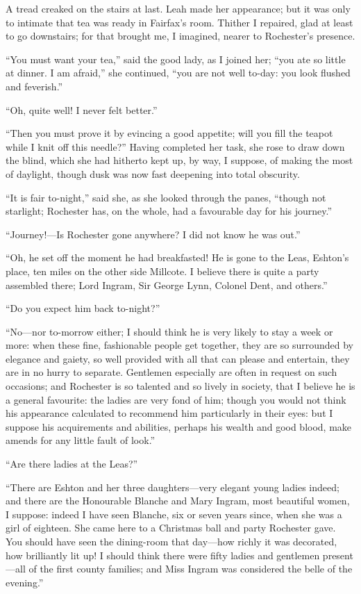 A tread creaked on the stairs at last.  Leah made her appearance; but it
was only to intimate that tea was ready in \Mrs{} Fairfax's room.  Thither
I repaired, glad at least to go downstairs; for that brought me, I
imagined, nearer to \Mr{} Rochester's presence.

\enquote{You must want your tea,} said the good lady, as I joined her;
\enquote{you ate so little at dinner.  I am afraid,} she continued,
\enquote{you are not well to-day: you look flushed and feverish.}

\enquote{Oh, quite well!  I never felt better.}

\enquote{Then you must prove it by evincing a good appetite; will you
fill the teapot while I knit off this needle?}  Having completed her
task, she rose to draw down the blind, which she had hitherto kept up,
by way, I suppose, of making the most of daylight, though dusk was now
fast deepening into total obscurity.

\enquote{It is fair to-night,} said she, as she looked through the
panes, \enquote{though not starlight; \Mr{} Rochester has, on the whole,
had a favourable day for his journey.}

\enquote{Journey!---Is \Mr{} Rochester gone anywhere?  I did not know he
was out.}

\enquote{Oh, he set off the moment he had breakfasted!  He is gone to
the Leas, \Mr{} Eshton's place, ten miles on the other side Millcote.  I
believe there is quite a party assembled there; Lord Ingram, Sir George
Lynn, Colonel Dent, and others.}

\enquote{Do you expect him back to-night?}

\enquote{No---nor to-morrow either; I should think he is very likely to
stay a week or more: when these fine, fashionable people get together,
they are so surrounded by elegance and gaiety, so well provided with all
that can please and entertain, they are in no hurry to separate. 
Gentlemen especially are often in request on such occasions; and \Mr{}
 Rochester is so talented and so lively in society, that I believe he is
a general favourite: the ladies are very fond of him; though you would
not think his appearance calculated to recommend him particularly in
their eyes: but I suppose his acquirements and abilities, perhaps his
wealth and good blood, make amends for any little fault of look.}

\enquote{Are there ladies at the Leas?}

\enquote{There are \Mrs{} Eshton and her three daughters---very elegant
young ladies indeed; and there are the Honourable Blanche and Mary
Ingram, most beautiful women, I suppose: indeed I have seen Blanche, six
or seven years since, when she was a girl of eighteen.  She came here to
a Christmas ball and party \Mr{} Rochester gave.  You should have seen the
dining-room that day---how richly it was decorated, how brilliantly lit
up!  I should think there were fifty ladies and gentlemen present---all
of the first county families; and Miss Ingram was considered the belle
of the evening.}

